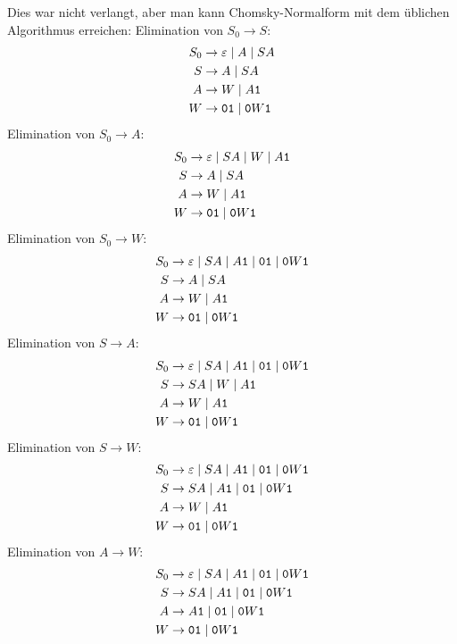 \begin{loesung}
Dies war nicht verlangt, aber man kann Chomsky-Normalform mit dem
üblichen Algorithmus erreichen: Elimination von $S_0\to S$:
\begin{align*}
S_0&\to \varepsilon\;|\;A\;|\;SA\\
S  &\to A\;|\;SA\\
A  &\to W\;|\;A{\tt 1}\\
W  &\to {\tt 01}\;|\; {\tt 0}W{\tt 1}
\end{align*}
Elimination von $S_0\to A$:
\begin{align*}
S_0&\to \varepsilon\;|\;SA\;|\;W\;|\;A{\tt 1}\\
S  &\to A\;|\;SA\\
A  &\to W\;|\;A{\tt 1}\\
W  &\to {\tt 01}\;|\; {\tt 0}W{\tt 1}
\end{align*}
Elimination von $S_0\to W$:
\begin{align*}
S_0&\to \varepsilon\;|\;SA\;|\;A{\tt 1}\;|\;{\tt 01}\;|\;{\tt 0}W{\tt 1}\\
S  &\to A\;|\;SA\\
A  &\to W\;|\;A{\tt 1}\\
W  &\to {\tt 01}\;|\; {\tt 0}W{\tt 1}
\end{align*}
Elimination von $S\to A$:
\begin{align*}
S_0&\to \varepsilon\;|\;SA\;|\;A{\tt 1}\;|\;{\tt 01}\;|\;{\tt 0}W{\tt 1}\\
S  &\to SA\;|\;W\;|\;A{\tt 1}\\
A  &\to W\;|\;A{\tt 1}\\
W  &\to {\tt 01}\;|\; {\tt 0}W{\tt 1}
\end{align*}
Elimination von $S\to W$:
\begin{align*}
S_0&\to \varepsilon\;|\;SA\;|\;A{\tt 1}\;|\;{\tt 01}\;|\;{\tt 0}W{\tt 1}\\
S  &\to SA\;|\;A{\tt 1}\;|\;{\tt 01}\;|\;{\tt 0}W{\tt 1}\\
A  &\to W\;|\;A{\tt 1}\\
W  &\to {\tt 01}\;|\; {\tt 0}W{\tt 1}
\end{align*}
Elimination von $A\to W$:
\begin{align*}
S_0&\to \varepsilon\;|\;SA\;|\;A{\tt 1}\;|\;{\tt 01}\;|\;{\tt 0}W{\tt 1}\\
S  &\to SA\;|\;A{\tt 1}\;|\;{\tt 01}\;|\;{\tt 0}W{\tt 1}\\
A  &\to A{\tt 1}\;|\;{\tt 01}\;|\;{\tt 0}W{\tt 1}\\
W  &\to {\tt 01}\;|\; {\tt 0}W{\tt 1}
\end{align*}

\end{loesung}
